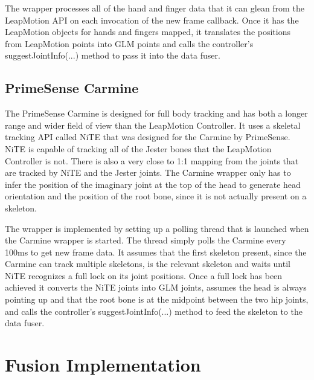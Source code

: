 The wrapper processes all of the hand and finger data that it can glean from the LeapMotion API on each invocation of the new frame callback. Once it has the LeapMotion objects for hands and fingers mapped, it translates the positions from LeapMotion points into GLM points and calls the controller's suggestJointInfo(...) method to pass it into the data fuser.

\subsection{PrimeSense Carmine}\label{sec:carmine_impl}

The PrimeSense Carmine is designed for full body tracking and has both a longer range and wider field of view than the LeapMotion Controller. It uses a skeletal tracking API called NiTE that was designed for the Carmine by PrimeSense. NiTE is capable of tracking all of the Jester bones that the LeapMotion Controller is not. There is also a very close to 1:1 mapping from the joints that are tracked by NiTE and the Jester joints. The Carmine wrapper only has to infer the position of the imaginary joint at the top of the head to generate head orientation and the position of the root bone, since it is not actually present on a skeleton.

The wrapper is implemented by setting up a polling thread that is launched when the Carmine wrapper is started. The thread simply polls the Carmine every 100ms to get new frame data. It assumes that the first skeleton present, since the Carmine can track multiple skeletons, is the relevant skeleton and waits until NiTE recognizes a full lock on its joint positions. Once a full lock has been achieved it converts the NiTE joints into GLM joints, assumes the head is always pointing up and that the root bone is at the midpoint between the two hip joints, and calls the controller's suggestJointInfo(...) method to feed the skeleton to the data fuser.

\section{Fusion Implementation}\label{sec:fuser_impl}

